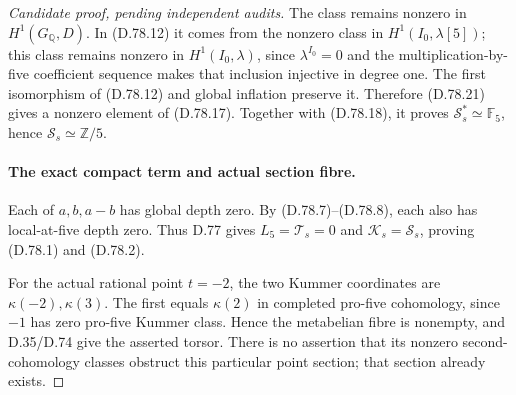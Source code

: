 \begin{proof}[Candidate proof, pending independent audits]
The class remains nonzero in \(H^1(G_{\mathbb Q},D)\).
In (D.78.12) it comes from the nonzero class in
\(H^1(I_0,\lambda[5])\); this class remains nonzero in
\(H^1(I_0,\lambda)\), since \(\lambda^{I_0}=0\) and
the multiplication-by-five coefficient sequence makes
that inclusion injective in degree one. The first
isomorphism of (D.78.12) and global inflation preserve
it. Therefore (D.78.21) gives a nonzero element of
(D.78.17). Together with (D.78.18), it proves
\(\mathcal S_s^*\simeq\mathbb F_5\), hence
\(\mathcal S_s\simeq\mathbb Z/5\).

\paragraph{The exact compact term and actual section fibre.}
Each of \(a,b,a-b\) has global depth zero. By
(D.78.7)--(D.78.8), each also has local-at-five
depth zero. Thus D.77 gives \(L_5=\mathcal T_s=0\)
and \(\mathcal K_s=\mathcal S_s\), proving (D.78.1)
and (D.78.2).

For the actual rational point \(t=-2\), the two
Kummer coordinates are \(\kappa(-2),\kappa(3)\).
The first equals \(\kappa(2)\) in completed pro-five
cohomology, since \(-1\) has zero pro-five Kummer class.
Hence the metabelian fibre is nonempty, and D.35/D.74
give the asserted torsor. There is no assertion that
its nonzero second-cohomology classes obstruct this
particular point section; that section already exists.
\end{proof}
